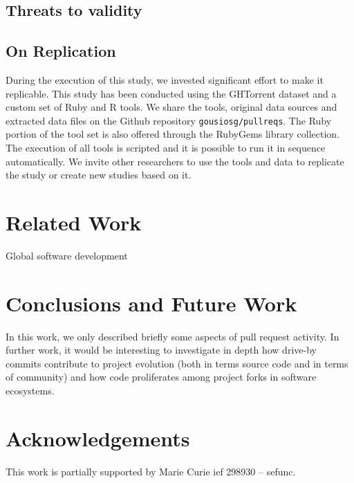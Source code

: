 \documentclass{sig-alternate}
\begin{document}
\subsection{Threats to validity}

\subsection{On Replication}

During the execution of this study, we invested significant effort to
make it replicable.  This study has been conducted using the GHTorrent dataset
and a custom set of Ruby and R tools. We share the tools, original data sources
and extracted data files on the Github repository \texttt{gousiosg/pullreqs}.
The Ruby portion of the tool set is also offered through the RubyGems library
collection. The execution of all tools is scripted and it is possible to run it
in sequence automatically. We invite other researchers to use the tools and data
to replicate the study or create new studies based on it.

\section{Related Work}

\cite{Bird09}
\cite{Cornf10}
\cite{Dabbi12}
\cite{Bird12}
\cite{Barr12}
\cite{Buffe99}
\cite{Mens02}
\cite{Shiha12}

Global software development
\section{Conclusions and Future Work}

In this work, we only described briefly some aspects of pull request activity.
In further work, it would be interesting to investigate in depth how drive-by
commits contribute to project evolution (both in terms source code and in
terms of community) and how code proliferates among project
forks in software ecosystems.

\section*{Acknowledgements}
This work is partially supported by Marie Curie {\sc ief} 298930 -- {\sc sefunc}.



\end{document}
